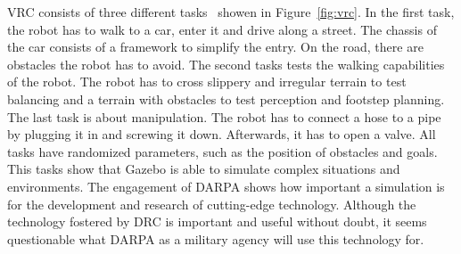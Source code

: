 VRC consists of three different tasks~\cite{vrc_rules} showen in Figure~\ref{fig:vrc}. In the first task, the robot has to walk to a car, enter it and drive along a street. The chassis of the car consists of a framework to simplify the entry. On the road, there are obstacles the robot has to avoid. The second tasks tests the walking capabilities of the robot. The robot has to cross slippery and irregular terrain to test balancing and a terrain with obstacles to test perception and footstep planning. The last task is about manipulation. The robot has to connect a hose to a pipe by plugging it in and screwing it down. Afterwards, it has to open a valve. All tasks have randomized parameters, such as the position of obstacles and goals. This tasks show that Gazebo is able to simulate complex situations and environments. The engagement of DARPA shows how important a simulation is for the development and research of cutting-edge technology. Although the technology fostered by DRC is important and useful without doubt, it seems questionable what DARPA as a military agency will use this technology for.


